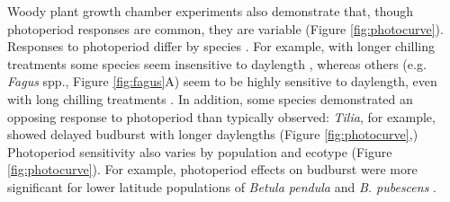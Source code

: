 \documentclass{article}
\begin{document}
\par Woody plant growth chamber experiments also demonstrate that, though photoperiod responses are common, they are variable (Figure \ref{fig:photocurve}). Responses to photoperiod differ by species \citep[e.g.,][]{Heide:1993a,Howe:1996,Basler:2012, Basler:2014aa,zohner2016,flynn2018}.
For example, with longer chilling treatments some species seem insensitive to daylength \citep[e.g.,\emph{Hammamelis} spp., \emph{Prunus} spp.][]{zohner2016}, %
whereas others (e.g. \emph{Fagus} spp., Figure \ref{fig:fagus}A) seem to be highly sensitive to daylength, even with long chilling treatments \citep{zohner2016}. In addition, some species demonstrated an opposing response to photoperiod than typically observed: \emph{Tilia}, for example, showed delayed budburst with longer daylengths (Figure \ref{fig:photocurve},\citep{Ashby:1962aa}) %
Photoperiod sensitivity also varies by population and ecotype \citep[e.g.,][]{Partanen:2005aa} (Figure \ref{fig:photocurve}). For example, photoperiod effects on budburst were more significant for lower latitude populations of \emph{Betula pendula} and \emph{B. pubescens} \citep{Partanen:2005aa}. %
\end{document}
